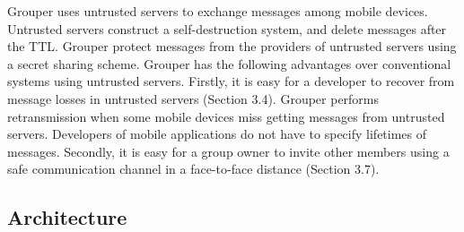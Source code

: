 \documentclass[twocolumn,10pt]{article}
\begin{document}
Grouper uses untrusted servers to exchange messages among mobile devices.
Untrusted servers construct a self-destruction system, and delete messages after the TTL.
Grouper protect messages from the providers of untrusted servers using a secret sharing scheme.
Grouper has the following advantages over conventional systems using untrusted servers.
Firstly, it is easy for a developer to recover from message losses in untrusted servers (Section 3.4).
Grouper performs retransmission when some mobile devices miss getting messages from untrusted servers.
Developers of mobile applications do not have to specify lifetimes of messages.
Secondly, it is easy for a group owner to invite other members using a safe communication channel in a face-to-face distance (Section 3.7).

\subsection{Architecture}
\end{document}
